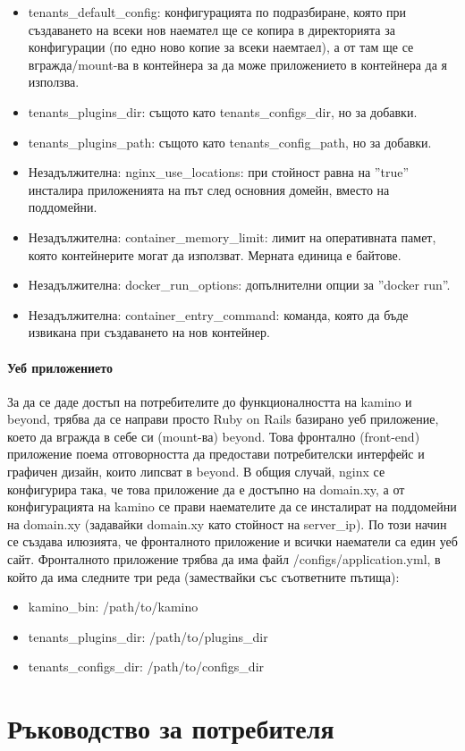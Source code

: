 \documentclass[pdftex,14pt,a4paper]{extreport}
\begin{document}
\begin{itemize}
  \item tenants\_default\_config: конфигурацията по подразбиране, която при създаването на всеки нов наемател ще се копира в директорията за конфигурации (по едно ново копие за всеки наемтаел), а от там ще се вгражда/mount-ва в контейнера за да може приложението в контейнера да я използва.
  \item tenants\_plugins\_dir: същото като tenants\_configs\_dir, но за добавки.
  \item tenants\_plugins\_path: същото като tenants\_config\_path, но за добавки.
  \item Незадължителна: nginx\_use\_locations: при стойност равна на ''true'' инсталира приложенията на път след основния домейн, вместо на поддомейни.
  \item Незадължителна: container\_memory\_limit: лимит на оперативната памет, която контейнерите могат да използват. Мерната единица е байтове.
  \item Незадължителна: docker\_run\_options: допълнителни опции за ''docker run''.
  \item Незадължителна: container\_entry\_command: команда, която да бъде извикана при създаването на нов контейнер.
\end{itemize}
\paragraph {Уеб приложението\\}
За да се даде достъп на потребителите до функционалността на kamino и beyond, трябва да се направи просто Ruby on Rails базирано уеб приложение, което да вгражда в себе си (mount-ва) beyond. Това фронтално (front-end) приложение поема отговорността да предостави потребителски интерфейс и графичен дизайн, които липсват в beyond. В общия случай, nginx се конфигурира така, че това приложение да е достъпно на domain.xy, а от конфигурацията на kamino се прави наемателите да се инсталират на поддомейни на domain.xy (задавайки domain.xy като стойност на server\_ip). По този начин се създава илюзията, че фронталното приложение и всички наематели са един уеб сайт. Фронталното приложение трябва да има файл /configs/application.yml, в който да има следните три реда (замествайки със съответните пътища):
\begin{itemize}
  \item kamino\_bin: /path/to/kamino
  \item tenants\_plugins\_dir: /path/to/plugins\_dir
  \item tenants\_configs\_dir: /path/to/configs\_dir
\end{itemize}
\section {Ръководство за потребителя}
\end{document}
